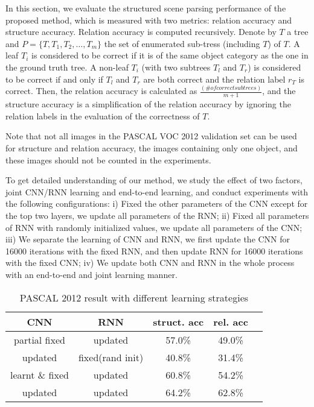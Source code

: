 \documentclass[10pt,twocolumn,letterpaper]{article}
\begin{document}
In this section, we evaluate the structured scene parsing performance of the proposed method, which is measured with two metrics: relation accuracy and structure accuracy. Relation accuracy is computed recursively. Denote by $T$ a tree and $P = \{T, T_1, T_2, \ldots, T_m\}$ the set of enumerated sub-tress (including $T$) of $T$. A leaf $T_i$ is considered to be correct if it is of the same object category as the one in the ground truth tree. A non-leaf $T_i$ (with two subtrees $T_l$ and $T_r$) is considered to be correct if and only if $T_l$ and $T_r$ are both correct and the relation label $r_T$ is correct. Then, the relation accuracy is calculated as $\frac{(\# of correct subtrees)}{m+1}$, and the structure accuracy is a simplification of the relation accuracy by ignoring the relation labels in the evaluation of the correctness of $T$.

Note that not all images in the PASCAL VOC 2012 validation set can be used for structure and relation accuracy, \eg the images containing only one object, and these images should not be counted in the experiments.









To get detailed understanding of our method, we study the effect of two factors, \ie joint CNN/RNN learning and end-to-end learning, and conduct experiments with the following configurations: i) Fixed the other parameters of the CNN except for the top two layers, we update all parameters of the RNN; ii) Fixed all parameters of RNN with randomly initialized values, we update all parameters of the CNN; iii) We separate the learning of CNN and RNN, \ie we first update the CNN for 16000 iterations with the fixed RNN, and then update RNN for 16000 iterations with the fixed CNN; iv) We update both CNN and RNN in the whole process with an end-to-end and joint learning manner.

\begin{table}[!ht]\small
\begin{center}
\begin{tabular}{|c|c|c|c|c|}

\hline
CNN & RNN & struct. acc & rel. acc \\
\hline
partial fixed & updated & 57.0\% & 49.0\% \\
\hline
updated & fixed(rand init) & 40.8\% & 31.4\% \\
\hline
learnt \& fixed & updated & 60.8\% & 54.2\% \\
\hline
updated & updated & 64.2\% & 62.8\% \\
\hline

\end{tabular}
\end{center}
\caption{PASCAL 2012 result with different learning strategies}
\label{tbl:result_end_to_end_learning}
\vspace{-2mm}
\end{table}
\end{document}
